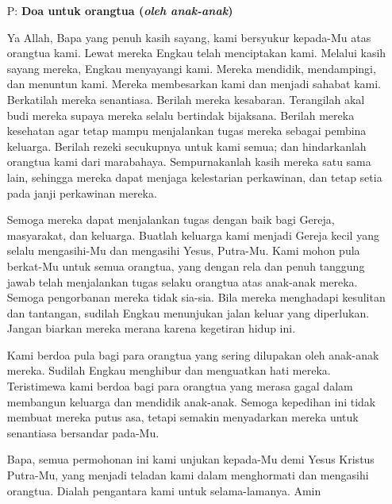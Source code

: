 \documentclass[a5paper,12pt,openany]{scrbook}
\newcommand{\BP}[1]{\begin{itemize} \item[P:] #1 \end{itemize}}
\begin{document}
\BP{\textbf{Doa untuk orangtua (\textit{oleh anak-anak})}

\small
Ya Allah, Bapa yang penuh kasih sayang, kami bersyukur kepada-Mu atas orangtua kami. Lewat mereka Engkau telah menciptakan kami. Melalui kasih sayang mereka, Engkau menyayangi kami. Mereka mendidik, mendampingi, dan menuntun kami. Mereka membesarkan kami dan menjadi sahabat kami.
Berkatilah mereka senantiasa. Berilah mereka kesabaran. Terangilah akal budi mereka supaya mereka selalu bertindak bijaksana. Berilah mereka kesehatan agar tetap mampu menjalankan tugas mereka sebagai pembina keluarga. Berilah rezeki secukupnya untuk kami semua; dan hindarkanlah orangtua kami dari marabahaya. Sempurnakanlah kasih mereka satu sama lain, sehingga mereka dapat menjaga kelestarian perkawinan, dan tetap setia pada janji perkawinan mereka.

Semoga mereka dapat menjalankan tugas dengan baik bagi Gereja, masyarakat, dan keluarga. Buatlah keluarga kami menjadi Gereja kecil yang selalu mengasihi-Mu dan mengasihi Yesus, Putra-Mu.
Kami mohon pula berkat-Mu untuk semua orangtua, yang dengan rela dan penuh tanggung jawab telah menjalankan tugas selaku orangtua atas anak-anak mereka. Semoga pengorbanan mereka tidak sia-sia. Bila mereka menghadapi kesulitan dan tantangan, sudilah Engkau menunjukan jalan keluar yang diperlukan. Jangan biarkan mereka merana karena kegetiran hidup ini.

Kami berdoa pula bagi para orangtua yang sering dilupakan oleh anak-anak mereka. Sudilah Engkau menghibur dan menguatkan hati mereka. Teristimewa kami berdoa bagi para orangtua yang merasa gagal dalam membangun keluarga dan mendidik anak-anak. Semoga kepedihan ini tidak membuat mereka putus asa, tetapi semakin menyadarkan mereka untuk senantiasa bersandar pada-Mu.

Bapa, semua permohonan ini kami unjukan kepada-Mu demi Yesus Kristus Putra-Mu, yang menjadi teladan kami dalam menghormati dan mengasihi orangtua. Dialah pengantara kami untuk selama-lamanya. Amin
}
\normalsize
\end{document}
